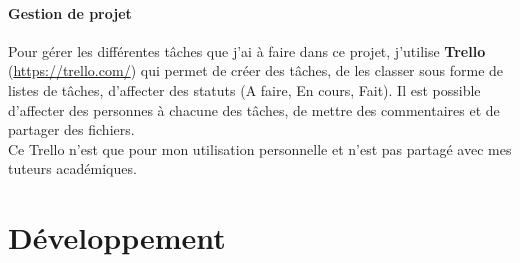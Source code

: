 \documentclass[poster]{polytech/polytech}
\begin{document}
\subsection{Gestion de projet}
Pour gérer les différentes tâches que j'ai à faire dans ce projet, j'utilise \textbf{Trello} (\url{https://trello.com/}) qui permet de créer des tâches, de les classer sous forme de listes de tâches, d'affecter des statuts (A faire, En cours, Fait). Il est possible d'affecter des personnes à chacune des tâches, de mettre des commentaires et de partager des fichiers.\\
Ce Trello n'est que pour mon utilisation personnelle et n'est pas partagé avec mes tuteurs académiques.


\part{Développement}
\label{part:part_dev}
\end{document}
